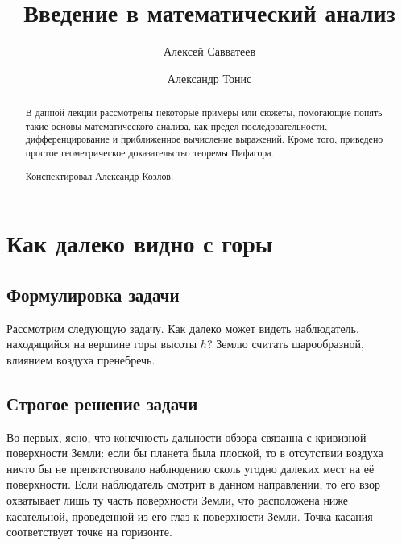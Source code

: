 \documentclass[12pt]{article}
\title{Введение в математический анализ}
\author{Алексей Савватеев \and Александр Тонис}
\begin{document}
\maketitle
\begin{abstract}
В данной лекции рассмотрены некоторые примеры или сюжеты, помогающие понять такие основы математического анализа, как предел последовательности, дифференцирование и приближенное вычисление выражений. Кроме того, приведено простое геометрическое доказательство теоремы Пифагора.
	\par
Конспектировал Александр Козлов. 
\end{abstract}	
\tableofcontents
\newpage
\section{Как далеко видно с горы}

\subsection{Формулировка задачи}
Рассмотрим следующую задачу. Как далеко может видеть наблюдатель, находящийся на вершине горы высоты $h$? Землю считать шарообразной, влиянием воздуха пренебречь. 

\subsection{Строгое решение задачи}
Во\--первых, ясно, что конечность дальности обзора связанна с кривизной поверхности Земли: если бы планета была плоской, то в отсутствии воздуха ничто бы не препятствовало наблюдению сколь угодно далеких мест на её поверхности. Если наблюдатель смотрит в данном направлении, то его взор охватывает лишь ту часть поверхности Земли, что расположена ниже касательной, проведенной из его глаз к поверхности Земли. Точка касания соответствует точке на горизонте. 
\end{document}
